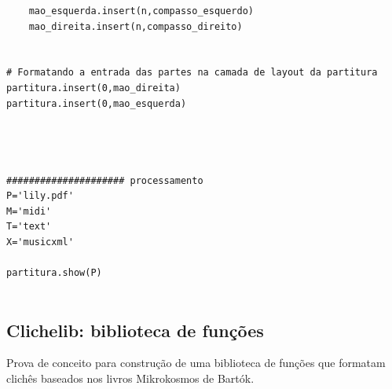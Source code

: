 \documentclass[
	12pt,				%
	openright,			%
	twoside,			%
	a4paper,			%
	english,			%
	french,				%
	spanish,			%
	brazil				%
	]{abntex2}
\begin{document}
\begin{lstlisting}
	mao_esquerda.insert(n,compasso_esquerdo)
	mao_direita.insert(n,compasso_direito)


# Formatando a entrada das partes na camada de layout da partitura
partitura.insert(0,mao_direita)
partitura.insert(0,mao_esquerda)




##################### processamento
P='lily.pdf'
M='midi'
T='text'
X='musicxml'

partitura.show(P)


\end{lstlisting}

\subsection{Clichelib: biblioteca de funções}

Prova de conceito para construção de uma biblioteca de funções que formatam clichês baseados nos livros Mikrokosmos de Bartók.
\end{document}
